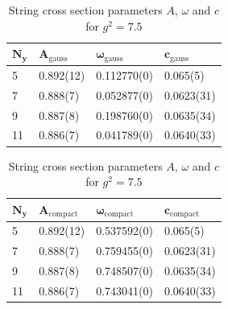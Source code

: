 \begin{table}[!hb]
\centering
\begin{tabular}{llll}
    $\mathbf{N_y}$ & $\mathbf{A_\mathrm{gauss}}$ & $\mathbf{\omega_\mathrm{gauss}}$ & $\mathbf{c_\mathrm{gauss}}$ \\ \hline
   5 & 0.892(12) & 0.112770(0) & 0.065(5) \\
   7 & 0.888(7) & 0.052877(0) & 0.0623(31) \\
   9 & 0.887(8) & 0.198760(0) & 0.0635(34) \\
   11 & 0.886(7) & 0.041789(0) & 0.0640(33) \\
\end{tabular}
\begin{tabular}{llll}
    $\mathbf{N_y}$ & $\mathbf{A_\mathrm{compact}}$ & $\mathbf{\omega_\mathrm{compact}}$ & $\mathbf{c_\mathrm{compact}}$ \\ \hline
   5 & 0.892(12) & 0.537592(0) & 0.065(5) \\
   7 & 0.888(7) & 0.759455(0) & 0.0623(31) \\
   9 & 0.887(8) & 0.748507(0) & 0.0635(34) \\
   11 & 0.886(7) & 0.743041(0) & 0.0640(33) \\
\end{tabular}
\caption{String cross section parameters $A$, $\omega$ and $c$ for $g^2=7.5$}
\end{table}
